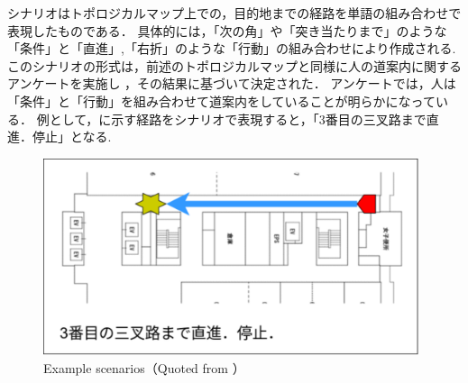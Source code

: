 シナリオはトポロジカルマップ上での，目的地までの経路を単語の組み合わせで表現したものである．
具体的には，「次の角」や「突き当たりまで」のような「条件」と「直進」,「右折」のような「行動」の組み合わせにより作成される.
このシナリオの形式は，前述のトポロジカルマップと同様に人の道案内に関するアンケートを実施し
，その結果に基づいて決定された．
アンケートでは，人は「条件」と「行動」を組み合わせて道案内をしていることが明らかになっている．
例として，に示す経路をシナリオで表現すると，「3番目の三叉路まで直進．停止」となる.

\vspace{3zh}
\begin{figure}[htbp]
    \centering
     \includegraphics[width=110mm]{images/pdf/scenario/scenario01.pdf}
     \caption[Example scenarios]{Example scenarios（Quoted from \cite{haruyama2023}）}
     \label{fig:scenario01}
\end{figure}